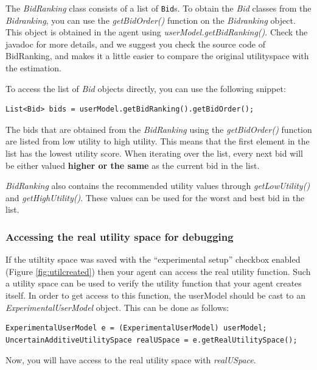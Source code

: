 \documentclass[]{article}
\begin{document}
The \textit{BidRanking} class consists of a list of \verb|Bid|s. To obtain the \textit{Bid} classes from the \textit{Bidranking}, you can use the \textit{getBidOrder()} function on the \textit{Bidranking} object. This object is obtained in the agent using \textit{userModel.getBidRanking()}. Check the javadoc for more details, and we suggest you check the source code of BidRanking, and makes it a little easier to compare the original utilityspace with the estimation.

To access the list of \textit{Bid} objects directly, you can use the following snippet:
\begin{lstlisting}
List<Bid> bids = userModel.getBidRanking().getBidOrder();
\end{lstlisting}

The bids that are obtained from the \textit{BidRanking} using the \textit{getBidOrder()} function are listed from low utility to high utility. This means that the first element in the list has the lowest utility score. When iterating over the list, every next bid will be either valued \textbf{higher or the same} as the current bid in the list.

\textit{BidRanking} also contains the recommended utility values through \textit{getLowUtility()} and \textit{getHighUtility()}. These values can be used for the worst and best bid in the list.


\subsubsection{Accessing the real utility space for debugging}
If the utiltity space was saved with the ``experimental setup'' checkbox enabled (Figure \ref{fig:utilcreated}) then your agent can access the real utility function. Such a utility space can be used to verify the utility function that your agent creates itself. In order to get access to this function, the userModel should be cast to an \textit{ExperimentalUserModel} object. This can be done as follows:
\begin{lstlisting}
ExperimentalUserModel e = (ExperimentalUserModel) userModel;
UncertainAdditiveUtilitySpace realUSpace = e.getRealUtilitySpace();
\end{lstlisting}

Now, you will have access to the real utility space with \textit{realUSpace}.
\end{document}
